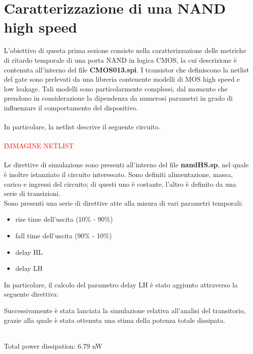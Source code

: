 \documentclass[11pt,  english, makeidx, a4paper, titlepage, oneside]{book}
\newenvironment{listato}{\footnotesize} {\normalsize }
\begin{document}
\section{Caratterizzazione di una NAND high speed}
L'obiettivo di questa prima sezione consiste nella caratterizzazione delle metriche di ritardo temporale di una porta NAND in logica CMOS, la cui descrizione è contenuta all'interno del file \textbf{CMOS013.spi}.
I transistor che definiscono la netlist del gate sono prelevati da una libreria contenente modelli di MOS high speed e low leakage. Tali modelli sono particolarmente complessi, dal momento che prendono in considerazione la dipendenza da numerosi parametri in grado di influenzare il comportamento del dispositivo.
\\\\
In particolare, la netlist descrive il seguente circuito.
\\\\
\textcolor{red}{IMMAGINE NETLIST}
\\\\
Le direttive di simulazione sono presenti all'interno del file \textbf{nandHS.sp}, nel quale è inoltre istanziato il circuito interessato. Sono definiti alimentazione, massa, carico e ingressi del circuito; di questi uno è costante, l'altro è definito da una serie di transizioni.
\\
Sono presenti una serie di direttive atte alla misura di vari parametri temporali:
\begin{itemize}
\item rise time dell'uscita (10\% - 90\%)
\item fall time dell'uscita (90\% - 10\%)
\item delay HL
\item delay LH
\end{itemize}
In particolare, il calcolo del parametro delay LH è stato aggiunto attraverso la seguente direttiva:
\begin{center}
\begin{listato}
	\centerline{}
\end{listato}
\end{center}
\vspace{0.3cm}
Successivamente è stata lanciata la simulazione relativa all'analisi del transitorio, grazie alla quale è stata ottenuta una stima della potenza totale dissipata.
\\\\
\centerline{Total power dissipation: 6.79 nW}
\end{document}
